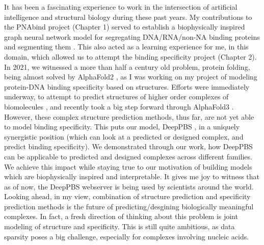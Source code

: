 
It has been a fascinating experience to work in the intersection of artificial intelligence and structural biology during these past years. My contributions to the PNAbind project (Chapter 1) served to establish a biophysically inspired graph neural network model for segregating DNA/RNA/non-NA binding proteins and segmenting them \citep{Sagendorf2024}. This also acted as a learning experience for me, in this domain, which allowed us to attempt the binding specificity project (Chapter 2). In 2021, we witnessed a more than half a century old problem, protein folding, being almost solved by AlphaFold2 \citep{Jumper2021}, as I was working on my project of modeling protein-DNA binding specificity based on structures. Efforts were immediately underway, to attempt to predict structures of higher order complexes of biomolecules \citep{evans2021protein,baek2024na}, and recently took a big step forward through AlphaFold3 \citep{Abramson2024}. However, these complex structure prediction methods, thus far, are not yet able to model binding specificity. This puts our model, DeepPBS \citep{Mitra2024}, in a uniquely synergistic position (which can look at a predicted or designed complex, and predict binding specificity). We demonstrated through our work, how DeepPBS can be applicable to predicted and designed complexes across different families. We achieve this impact while staying true to our motivation of building models which are biophysically inspired and interpretable. It gives me joy to  witness that as of now, the DeepPBS webserver is being used by scientists around the world. Looking ahead, in my view, combination of structure prediction and specificity prediction methods is the future of predicting/desgining biologically meaningful complexes. In fact, a fresh direction of thinking about this problem is joint modeling of structure and specificity. This is still quite ambitious, as data sparsity poses a big challenge, especially for complexes involving nucleic acids. 

